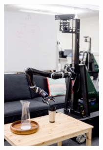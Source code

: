 \begin{figure}[t!]

	\quad
	\begin{subfigure}[t]{1.4in}
		\centering
        \includegraphics[width=\textwidth]{images/ut_poli.jpg}

\end{subfigure}
\end{figure}
